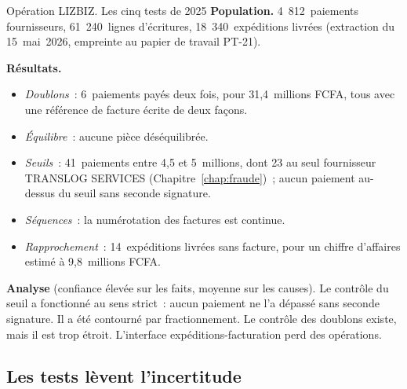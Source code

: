 \begin{boxscenario}{Opération LIZBIZ. Les cinq tests de 2025}
\textbf{Population.} 4~812~paiements fournisseurs, 61~240~lignes
d'écritures, 18~340~expéditions livrées (extraction du 15~mai~2026, empreinte
au papier de travail PT-21).

\medskip
\textbf{Résultats.}
\begin{itemize}
    \item \emph{Doublons}~: 6~paiements payés deux fois, pour 31,4~millions
          FCFA, tous avec une référence de facture écrite de deux façons.
    \item \emph{Équilibre}~: aucune pièce déséquilibrée.
    \item \emph{Seuils}~: 41~paiements entre 4,5 et 5~millions, dont 23 au
          seul fournisseur TRANSLOG SERVICES (Chapitre~\ref{chap:fraude})~;
          aucun paiement au-dessus du seuil sans seconde signature.
    \item \emph{Séquences}~: la numérotation des factures est continue.
    \item \emph{Rapprochement}~: 14~expéditions livrées sans facture, pour un
          chiffre d'affaires estimé à 9,8~millions FCFA.
\end{itemize}

\medskip
\textbf{Analyse} (confiance élevée sur les faits, moyenne sur les causes).
Le contrôle du seuil a fonctionné au sens strict~: aucun paiement ne l'a
dépassé sans seconde signature. Il a été contourné par fractionnement.
Le contrôle des doublons existe, mais il est trop étroit. L'interface
expéditions-facturation perd des opérations.
\end{boxscenario}

\subsection{Les tests lèvent l'incertitude}

